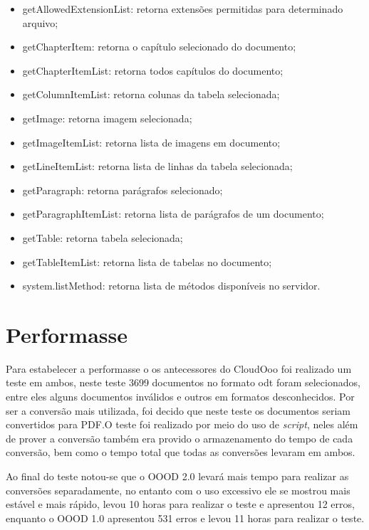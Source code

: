 \begin{itemize}
    \item{getAllowedExtensionList: retorna extensões permitidas para determinado arquivo;}
    \item{getChapterItem: retorna o capítulo selecionado do documento;}
    \item{getChapterItemList: retorna todos capítulos do documento;}
    \item{getColumnItemList: retorna colunas da tabela selecionada;}
    \item{getImage: retorna imagem selecionada;}
    \item{getImageItemList: retorna lista de imagens em documento;}
    \item{getLineItemList: retorna lista de linhas da tabela selecionada;}
    \item{getParagraph: retorna parágrafos selecionado;}
    \item{getParagraphItemList: retorna lista de parágrafos de um documento;}
    \item{getTable: retorna tabela selecionada;}
    \item{getTableItemList: retorna lista de tabelas no documento;}
    \item{system.listMethod: retorna lista de métodos disponíveis no servidor.}
\end{itemize}

\section{Performasse}

Para estabelecer a performasse o os antecessores do CloudOoo foi realizado um teste em ambos, neste teste 3699 documentos no formato odt foram selecionados, entre eles alguns documentos inválidos e outros em formatos desconhecidos. Por ser a conversão mais utilizada, foi decido que neste teste os documentos seriam convertidos para PDF.O teste foi realizado por meio do uso de \textit{script}, neles além de prover a conversão também era provido o armazenamento do tempo de cada conversão, bem como o tempo total que todas as conversões levaram em ambos.

Ao final do teste notou-se que o OOOD 2.0 levará mais tempo para realizar as conversões separadamente, no entanto com o uso excessivo ele se mostrou mais estável e mais rápido, levou 10 horas para realizar o teste e apresentou 12 erros, enquanto o OOOD 1.0 apresentou 531 erros e levou 11 horas para realizar o teste.

